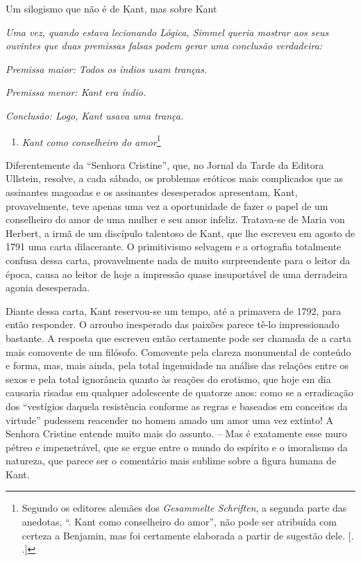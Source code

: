 Um silogismo que não é de Kant, mas sobre Kant

\emph{Uma vez, quando estava lecionando Lógica, Simmel queria mostrar
aos seus ouvintes que duas premissas falsas podem gerar uma conclusão
verdadeira:}

\emph{Premissa maior: Todos os índios usam tranças.}

\emph{Premissa menor: Kant era índio.}

\emph{Conclusão: Logo, Kant usava uma trança.}

\begin{enumerate}
\def\labelenumi{\Roman{enumi}.}
\setcounter{enumi}{1}
\item
  \emph{Kant como conselheiro do amor}\footnote{Segundo os editores
    alemães dos \emph{Gesammelte Schriften}, a segunda parte das
    anedotas, ``. Kant como conselheiro do amor'', não pode ser
    atribuída com certeza a Benjamin, mas foi certamente elaborada a
    partir de sugestão dele. [. .]}
\end{enumerate}

Diferentemente da ``Senhora Cristine'', que, no Jornal da Tarde da
Editora Ullstein, resolve, a cada sábado, os problemas eróticos mais
complicados que as assinantes magoadas e os assinantes desesperados
apresentam, Kant, provavelmente, teve apenas uma vez a oportunidade de
fazer o papel de um conselheiro do amor de uma mulher e seu amor
infeliz. Tratava-se de Maria von Herbert, a irmã de um discípulo
talentoso de Kant, que lhe escreveu em agosto de 1791 uma carta
dilacerante. O primitivismo selvagem e a ortografia totalmente confusa
dessa carta, provavelmente nada de muito surpreendente para o leitor da
época, causa ao leitor de hoje a impressão quase insuportável de uma
derradeira agonia desesperada.

Diante dessa carta, Kant reservou-se um tempo, até a primavera de 1792,
para então responder. O arroubo inesperado das paixões parece tê-lo
impressionado bastante. A resposta que escreveu então certamente pode
ser chamada de a carta mais comovente de um filósofo. Comovente pela
clareza monumental de conteúdo e forma, mas, mais ainda, pela total
ingenuidade na análise das relações entre os sexos e pela total
ignorância quanto às reações do erotismo, que hoje em dia causaria
risadas em qualquer adolescente de quatorze anos: como se a erradicação
dos ``vestígios daquela resistência conforme as regras e baseados em
conceitos da virtude'' pudessem reacender no homem amado um amor uma vez
extinto! A Senhora Cristine entende muito mais do assunto. -- Mas é
exatamente esse muro pétreo e impenetrável, que se ergue entre o mundo
do espírito e o imoralismo da natureza, que parece ser o comentário mais
sublime sobre a figura humana de Kant.

